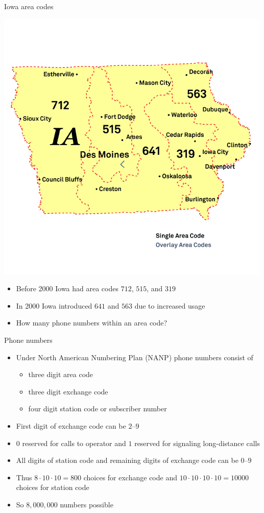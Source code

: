 \documentclass[handout]{beamer}
\theoremstyle{definition}
\begin{document}
\begin{frame}{Iowa area codes}
\begin{multicols}{2}
\includegraphics[scale=.35]{Iowa}
\begin{itemize}
\item Before 2000 Iowa had area codes $712$, $515$, and $319$
\item In 2000 Iowa introduced $641$ and $563$ due to increased usage
\item How many phone numbers within an area code?
\end{itemize}
\end{multicols}
\end{frame}

\begin{frame}{Phone numbers}
\begin{itemize}
\item Under North American Numbering Plan (NANP)
phone numbers consist of 
\begin{itemize}
\item three digit \alert{area code}
\item three digit \alert{exchange code}
\item four digit \alert{station code} or \alert{subscriber number}
\end{itemize}
\item First digit of exchange code can be $2$--$9$
\item $0$ reserved for calls to operator and 
$1$ reserved for signaling long-distance calls
\item All digits of station code and remaining digits
of exchange code can be $0$--$9$
\item Thus $8\cdot 10\cdot 10=800$ choices
for exchange code and $10\cdot 10\cdot 10\cdot 10=10000$
choices for station code
\item So $8,000,000$ numbers possible
\end{itemize}
\end{frame}
\end{document}
